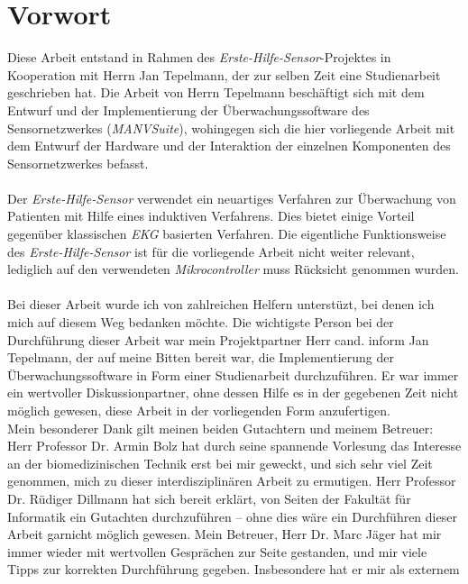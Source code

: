 \chapter*{Vorwort} 

Diese Arbeit entstand in Rahmen des \emph{Erste-Hilfe-Sensor}-Projektes in Kooperation mit Herrn Jan Tepelmann,
der zur selben Zeit eine Studienarbeit geschrieben hat\cite{Jan}. Die Arbeit von Herrn Tepelmann
beschäftigt sich mit dem Entwurf und der Implementierung der Überwachungssoftware des Sensornetzwerkes
(\emph{MANVSuite}), wohingegen sich die hier vorliegende Arbeit mit dem Entwurf der Hardware und der Interaktion der
einzelnen Komponenten des Sensornetzwerkes befasst.\\
\\
Der \emph{Erste-Hilfe-Sensor} verwendet ein neuartiges Verfahren zur Überwachung von Patienten mit Hilfe eines induktiven
Verfahrens. Dies bietet einige Vorteil gegenüber klassischen \emph{EKG} basierten Verfahren. Die eigentliche Funktionsweise
des \emph{Erste-Hilfe-Sensor} ist für die vorliegende Arbeit nicht weiter relevant, lediglich auf den verwendeten
\emph{Mikrocontroller} muss Rücksicht genommen wurden.\\
\\
Bei dieser Arbeit wurde ich von zahlreichen Helfern unterstüzt, bei denen ich mich auf diesem Weg bedanken möchte. 
Die wichtigste Person bei der Durchführung dieser Arbeit war mein Projektpartner Herr cand. inform Jan Tepelmann, der 
auf meine Bitten bereit war, die Implementierung der Überwachungssoftware in Form einer Studienarbeit durchzuführen. Er
war immer ein wertvoller Diskussionpartner, ohne dessen Hilfe es in der gegebenen Zeit nicht möglich gewesen, 
diese Arbeit in der vorliegenden Form anzufertigen.\\
Mein besonderer Dank gilt meinen beiden Gutachtern und meinem Betreuer: Herr Professor Dr. Armin Bolz hat durch seine 
spannende Vorlesung das Interesse an der biomedizinischen Technik erst bei mir geweckt, und sich sehr viel Zeit 
genommen, mich zu dieser interdisziplinären Arbeit zu ermutigen. Herr Professor Dr. Rüdiger Dillmann hat sich bereit 
erklärt, von Seiten der Fakultät für Informatik ein Gutachten durchzuführen -- ohne dies wäre ein Durchführen 
dieser Arbeit garnicht möglich gewesen. Mein Betreuer, Herr Dr. Marc Jäger hat mir immer wieder mit wertvollen Gesprächen
zur Seite gestanden, und mir viele Tipps zur korrekten Durchführung gegeben. Insbesondere hat er mir als externem 
